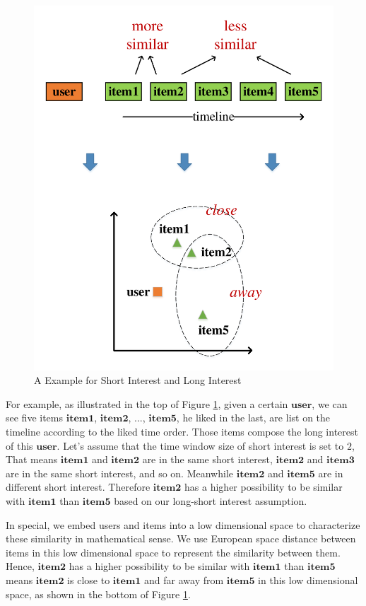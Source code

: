 \documentclass{llncs}
\begin{document}
\begin{figure}[htbp]
	\centering
	\includegraphics[scale=0.5]{images/embedding.pdf}
	\caption{A Example for Short Interest and Long Interest}
	\label{fig:embedding}
\end{figure}

For example, as illustrated in the top of Figure \ref{fig:embedding},
given a certain $\mathbf{user}$, we can see five items
$\mathbf{item1}$, $\mathbf{item2}$, ..., $\mathbf{item5}$, he liked in the last,
are list on the timeline according to the liked time order.
Those items compose the long interest of this $\mathbf{user}$.
Let's assume that the time window size of short interest is set to $2$,
That means $\mathbf{item1}$ and $\mathbf{item2}$ are in the same short interest,
$\mathbf{item2}$ and $\mathbf{item3}$ are in the same short interest, and so on.
Meanwhile $\mathbf{item2}$ and $\mathbf{item5}$ are in different short interest.
Therefore $\mathbf{item2}$ has a higher possibility to be similar with $\mathbf{item1}$
than $\mathbf{item5}$ based on our long-short interest assumption.

In special, we embed users and items into a low dimensional space
to characterize these similarity in mathematical sense.
We use European space distance between items in this low dimensional space
to represent the similarity between them.
Hence, $\mathbf{item2}$ has a higher possibility to be similar with $\mathbf{item1}$
than $\mathbf{item5}$ means $\mathbf{item2}$ is close to $\mathbf{item1}$ and far away from $\mathbf{item5}$
in this low dimensional space, as shown in the bottom of Figure \ref{fig:embedding}.
\end{document}
